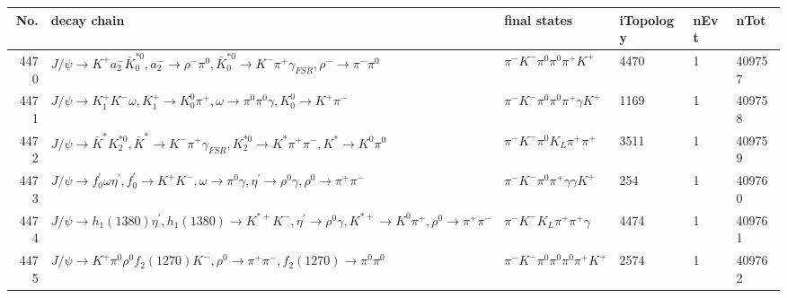 \begin{table}[htbp] 
\begin{center}
\begin{small}
\begin{tabular}{rlllll}\hline\hline
 No. & decay chain & final states &  iTopology & nEvt & nTot \\\hline
4470&$J/\psi       \rightarrow K^{+}          a_{2}^{-}      \bar{K}_0^{*0}, a_{2}^{-}       \rightarrow \rho^{-}      \pi^{0}        , \bar{K}_0^{*0} \rightarrow K^{-}          \pi^{+}        \gamma_{FSR} , \rho^{-}       \rightarrow \pi^{-}        \pi^{0}        $&$\pi^{-}        K^{-}          \pi^{0}        \pi^{0}        \pi^{+}        K^{+}          $& 4470&    1&409757\\
4471&$J/\psi       \rightarrow K_1^{+}        K^{-}          \omega         , K_1^{+}         \rightarrow K_0^{0}        \pi^{+}        , \omega          \rightarrow \pi^{0}        \pi^{0}        \gamma       , K_0^{0}         \rightarrow K^{+}          \pi^{-}        $&$\pi^{-}        K^{-}          \pi^{0}        \pi^{0}        \pi^{+}        \gamma       K^{+}          $& 1169&    1&409758\\
4472&$J/\psi       \rightarrow \bar{K}^{*}   K_2^{*0}       , \bar{K}^{*}    \rightarrow K^{-}          \pi^{+}        \gamma_{FSR} , K_2^{*0}        \rightarrow K^{*}          \pi^{+}        \pi^{-}        , K^{*}           \rightarrow K^{0}          \pi^{0}        $&$\pi^{-}        K^{-}          \pi^{0}        K_{L}          \pi^{+}        \pi^{+}        $& 3511&    1&409759\\
4473&$J/\psi       \rightarrow f^{'}_{0}     \omega         \eta^{\prime} , f^{'}_{0}      \rightarrow K^{+}          K^{-}          , \omega          \rightarrow \pi^{0}        \gamma       , \eta^{\prime}  \rightarrow \rho^{0}      \gamma       , \rho^{0}       \rightarrow \pi^{+}        \pi^{-}        $&$\pi^{-}        K^{-}          \pi^{0}        \pi^{+}        \gamma       \gamma       K^{+}          $&  254&    1&409760\\
4474&$J/\psi       \rightarrow h_{1}(1380)    \eta^{\prime} , h_{1}(1380)     \rightarrow K^{*+}         K^{-}          , \eta^{\prime}  \rightarrow \rho^{0}      \gamma       , K^{*+}          \rightarrow K^{0}          \pi^{+}        , \rho^{0}       \rightarrow \pi^{+}        \pi^{-}        $&$\pi^{-}        K^{-}          K_{L}          \pi^{+}        \pi^{+}        \gamma       $& 4474&    1&409761\\
4475&$J/\psi       \rightarrow K^{+}          \pi^{0}        \rho^{0}      f_{2}(1270)    K^{-}          , \rho^{0}       \rightarrow \pi^{+}        \pi^{-}        , f_{2}(1270)     \rightarrow \pi^{0}        \pi^{0}        $&$\pi^{-}        K^{-}          \pi^{0}        \pi^{0}        \pi^{0}        \pi^{+}        K^{+}          $& 2574&    1&409762\\

\end{tabular}
\end{small}
\end{center}
\end{table}
